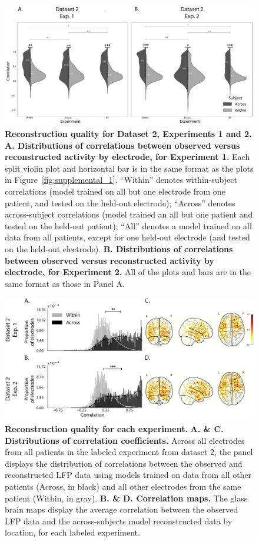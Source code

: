 \documentclass[10pt]{article}
\begin{document}
\begin{figure}[p]
\centering
\includegraphics[width=\textwidth]{figs/supplemental_2}
\caption{\textbf{Reconstruction quality for Dataset 2,
    Experiments 1 and 2.} \textbf{A. Distributions of correlations
    between observed versus reconstructed activity by electrode, for
    Experiment 1.}  Each split violin plot and horizontal bar is in
  the same format as the plots in Figure~\ref{fig:supplemental_1}.
  ``Within'' denotes within-subject correlations (model trained on all
  but one electrode from one patient, and tested on the held-out
  electrode); ``Across'' denotes across-subject correlations (model
  trained an all but one patient and tested on the held-out patient);
  ``All'' denotes a model trained on all data from all patients,
  except for one held-out electrode (and tested on the held-out
  electrode).  \textbf{B. Distributions of correlations between
    observed versus reconstructed activity by electrode, for
    Experiment 2.}  All of the plots and bars are in the same format
  as those in Panel A.}
\label{fig:supplemental_2}
\end{figure}

\begin{figure}[p]
\centering
\includegraphics[width=\textwidth]{figs/supplemental_3}
\caption{\textbf{Reconstruction quality for each experiment.} \textbf{A. \& C.  Distributions
      of correlation coefficients.}  Across all electrodes from all
    patients in the labeled experiment from dataset 2, the panel displays the distribution of correlations between the observed and reconstructed LFP data using models trained on data from all other patients (Across, in black) and all other electrodes from the same patient (Within, in gray). 
    \textbf{B. \& D. Correlation maps.}  The glass brain maps display the
    average correlation between the observed LFP data and the across-subjects model reconstructed data by location, for each labeled experiment.}
\label{fig:supplemental_3}
\end{figure}
\end{document}
